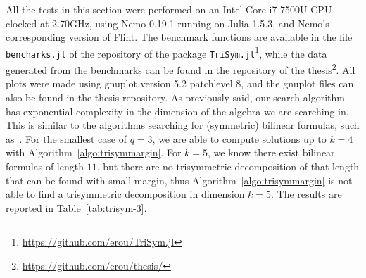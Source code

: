 All the tests in this section were performed on an Intel Core i7-7500U
CPU clocked at 2.70GHz, using Nemo 0.19.1 running on Julia 1.5.3, and Nemo’s
corresponding version of Flint. The benchmark functions are available in the
file \texttt{bencharks.jl} of the repository of the package
\texttt{TriSym.jl}\footnote{\url{https://github.com/erou/TriSym.jl}}, while the
data generated from the benchmarks can be found in the repository of the
thesis\footnote{\url{https://github.com/erou/thesis/}}. All plots were made
using gnuplot version 5.2 patchlevel 8, and the gnuplot files can also be found
in the thesis repository. As previously said, our search
algorithm has exponential complexity in the dimension of the algebra we are
searching in. This is similar to the algorithms searching for (symmetric)
bilinear formulas, such as~\cite{Covanov19, BDEZ12}. For the smallest case of
$q=3$, we are able to compute solutions up to $k=4$ with
Algorithm~\ref{algo:trisymmargin}. For $k=5$, we know there exist bilinear
formulas of length $11$, but there are no trisymmetric decomposition of that
length that can be found with small margin, thus
Algorithm~\ref{algo:trisymmargin} is not able to find a trisymmetric
decomposition in dimension $k=5$. The results are reported in
Table~\ref{tab:trisym-3}.
